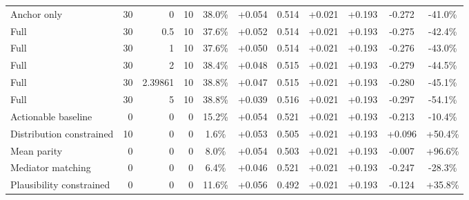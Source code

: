 \begin{table}[htbp]
\begin{tabular}{lrrrccccccc}
Anchor only & 30 & 0 & 10 & 38.0\% & +0.054 & 0.514 & +0.021 & +0.193 & -0.272 & -41.0\% \\
Full & 30 & 0.5 & 10 & 37.6\% & +0.052 & 0.514 & +0.021 & +0.193 & -0.275 & -42.4\% \\
Full & 30 & 1 & 10 & 37.6\% & +0.050 & 0.514 & +0.021 & +0.193 & -0.276 & -43.0\% \\
Full & 30 & 2 & 10 & 38.4\% & +0.048 & 0.515 & +0.021 & +0.193 & -0.279 & -44.5\% \\
Full & 30 & 2.39861 & 10 & 38.8\% & +0.047 & 0.515 & +0.021 & +0.193 & -0.280 & -45.1\% \\
Full & 30 & 5 & 10 & 38.8\% & +0.039 & 0.516 & +0.021 & +0.193 & -0.297 & -54.1\% \\
Actionable baseline & 0 & 0 & 0 & 15.2\% & +0.054 & 0.521 & +0.021 & +0.193 & -0.213 & -10.4\% \\
Distribution constrained & 10 & 0 & 0 & 1.6\% & +0.053 & 0.505 & +0.021 & +0.193 & +0.096 & +50.4\% \\
Mean parity & 0 & 0 & 0 & 8.0\% & +0.054 & 0.503 & +0.021 & +0.193 & -0.007 & +96.6\% \\
Mediator matching & 0 & 0 & 0 & 6.4\% & +0.046 & 0.521 & +0.021 & +0.193 & -0.247 & -28.3\% \\
Plausibility constrained & 0 & 0 & 0 & 11.6\% & +0.056 & 0.492 & +0.021 & +0.193 & -0.124 & +35.8\% \\
\bottomrule
\end{tabular}
\end{table}